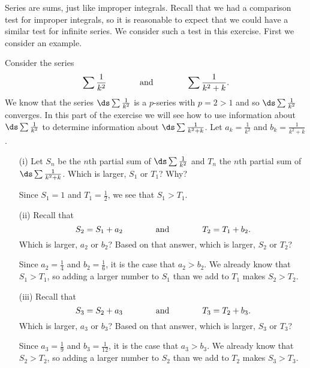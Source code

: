 \begin{exercises}
\item \label{ex:8.3_Direct_Comparison_Test} Series are sums, just like improper integrals. Recall that we had a comparison test for improper integrals, so it is reasonable to expect that we could have a similar test for infinite series. We consider such a test in this exercise. First we consider an example.
    \ba
    \item Consider the series
\[\sum \frac{1}{k^2} \hspace{0.5in} \text{ and } \hspace{0.5in} \sum \frac{1}{k^2+k}.\]
We know that the series $\ds \sum \frac{1}{k^2}$ is a $p$-series with $p = 2 > 1$ and so $\ds \sum \frac{1}{k^2}$ converges. In this part of the exercise we will see how to use information about $\ds \sum \frac{1}{k^2}$ to determine information about $\ds \sum \frac{1}{k^2+k}$. Let $a_k = \frac{1}{k^2}$ and $b_k = \frac{1}{k^2+k}$.
        \begin{itemize}
        \item[(i)] Let $S_n$ be the $n$th partial sum of $\ds \sum \frac{1}{k^2}$ and $T_n$ the $n$th partial sum of $\ds \sum \frac{1}{k^2+k}$. Which is larger, $S_1$ or $T_1$? Why?

\begin{exerciseSolution}
Since $S_1 = 1$ and $T_1 = \frac{1}{2}$, we see that $S_1 > T_1$.
\end{exerciseSolution}

        \item[(ii)] Recall that
\[S_2 = S_1 + a_2 \hspace{0.5in} \text{ and } \hspace{0.5in} T_2 = T_1 + b_2.\]
Which is larger, $a_2$ or $b_2$? Based on that answer, which is larger, $S_2$ or $T_2$?

\begin{exerciseSolution}
Since $a_2 = \frac{1}{4}$ and $b_2 = \frac{1}{6}$, it is the case that $a_2 > b_2$. We already know that $S_1 > T_1$, so adding a larger number to $S_1$ than we add to $T_1$ makes $S_2 > T_2$.
\end{exerciseSolution}

        \item[(iii)] Recall that
\[S_3 = S_2 + a_3 \hspace{0.5in} \text{ and } \hspace{0.5in} T_3 = T_2 + b_3.\]
Which is larger, $a_3$ or $b_3$? Based on that answer, which is larger, $S_3$ or $T_3$?

\begin{exerciseSolution}
Since $a_3 = \frac{1}{9}$ and $b_3 = \frac{1}{12}$, it is the case that $a_3 > b_3$. We already know that $S_2 > T_2$, so adding a larger number to $S_2$ than we add to $T_2$ makes $S_3 > T_3$.
\end{exerciseSolution}


\end{itemize}
\end{exercises}
